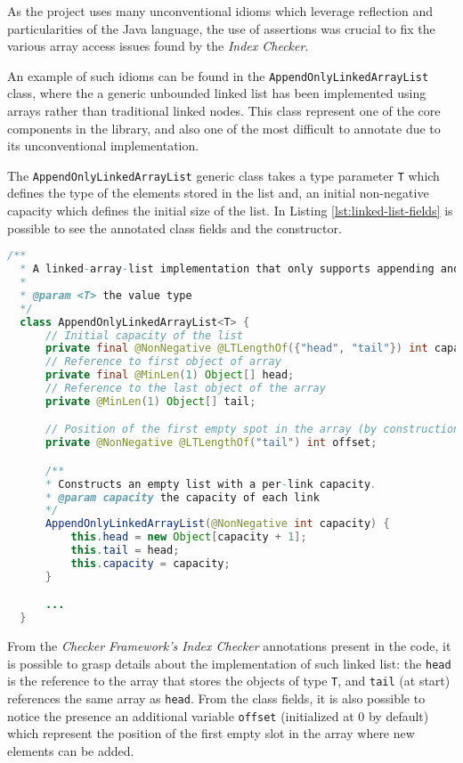 \documentclass[a4paper, 11pt]{article}
\begin{document}
As the project uses many unconventional idioms which leverage reflection and particularities of the Java language, the use of assertions was crucial to fix the various array access issues found by the \textit{Index Checker}.

\pagebreak

\noindent An example of such idioms can be found in the \texttt{AppendOnlyLinkedArrayList} class, where the a generic unbounded linked list has been implemented using arrays rather than traditional linked nodes. This class represent one of the core components in the library, and also one of the most difficult to annotate due to its unconventional implementation.

The \texttt{AppendOnlyLinkedArrayList} generic class takes a type parameter \texttt{T} which defines the type of the elements stored in the list and, an initial non-negative capacity which defines the initial size of the list. In Listing \ref{lst:linked-list-fields} is possible to see the annotated class fields and the constructor.

\begin{lstlisting}[language=java,breaklines=true,caption={AppendOnlyLinkedArrayList},label={lst:linked-list-fields},captionpos=b]
  /**
  * A linked-array-list implementation that only supports appending and consumption.
  *
  * @param <T> the value type
  */
  class AppendOnlyLinkedArrayList<T> {
      // Initial capacity of the list
      private final @NonNegative @LTLengthOf({"head", "tail"}) int capacity;
      // Reference to first object of array
      private final @MinLen(1) Object[] head;
      // Reference to the last object of the array
      private @MinLen(1) Object[] tail;

      // Position of the first empty spot in the array (by construction, could be at most equal to capacity)
      private @NonNegative @LTLengthOf("tail") int offset;

      /**
      * Constructs an empty list with a per-link capacity.
      * @param capacity the capacity of each link
      */
      AppendOnlyLinkedArrayList(@NonNegative int capacity) {
          this.head = new Object[capacity + 1];
          this.tail = head;
          this.capacity = capacity;
      }

      ...
  }
\end{lstlisting}

\noindent From the \textit{Checker Framework's Index Checker} annotations present in the code, it is possible to grasp details about the implementation of such linked list: the \texttt{head} is the reference to the array that stores the objects of type \texttt{T}, and \texttt{tail} (at start) references the same array as \texttt{head}. From the class fields, it is also possible to notice the presence an additional variable \texttt{offset} (initialized at 0 by default) which represent the position of the first empty slot in the array where new elements can be added.
\end{document}
